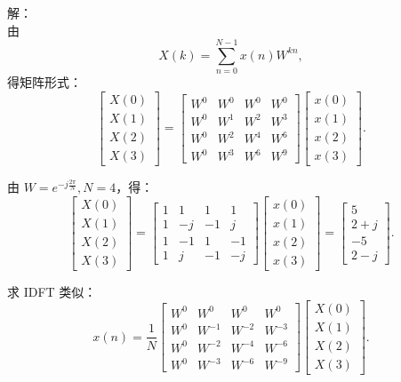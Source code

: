 \documentclass[a4paper,UTF8]{article}
\numberwithin{equation}{section}
\begin{document}
\begin{framed}
   	解：\\
   	由
   	\[
   	X(k) = \sum_{n=0}^{N-1} x(n)W^{kn},
   	\]
   	得矩阵形式：
   	\[
   	\begin{bmatrix}
   		X(0) \\ X(1) \\ X(2) \\ X(3)
   	\end{bmatrix}
   	=
   	\begin{bmatrix}
   		W^0 & W^0 & W^0 & W^0 \\
   		W^0 & W^1 & W^2 & W^3 \\
   		W^0 & W^2 & W^4 & W^6 \\
   		W^0 & W^3 & W^6 & W^9
   	\end{bmatrix}
   	\begin{bmatrix}
   		x(0) \\ x(1) \\ x(2) \\ x(3)
   	\end{bmatrix}.
   	\]
   	
   	由 $W = e^{-j\frac{2\pi}{N}}, N = 4$，得：
   	\[
   	\begin{bmatrix}
   		X(0) \\ X(1) \\ X(2) \\ X(3)
   	\end{bmatrix}
   	=
   	\begin{bmatrix}
   		1 & 1 & 1 & 1 \\
   		1 & -j & -1 & j \\
   		1 & -1 & 1 & -1 \\
   		1 & j & -1 & -j
   	\end{bmatrix}
   	\begin{bmatrix}
   		x(0) \\ x(1) \\ x(2) \\ x(3)
   	\end{bmatrix}
   	=
   	\begin{bmatrix}
   		5 \\ 2 + j \\ -5 \\ 2 - j
   	\end{bmatrix}.
   	\]
   	
   	求 IDFT 类似：
   	\[
   	x(n) =
   	\frac{1}{N}
   	\begin{bmatrix}
   		W^0 & W^0 & W^0 & W^0 \\
   		W^0 & W^{-1} & W^{-2} & W^{-3} \\
   		W^0 & W^{-2} & W^{-4} & W^{-6} \\
   		W^0 & W^{-3} & W^{-6} & W^{-9}
   	\end{bmatrix}
   	\begin{bmatrix}
   		X(0) \\ X(1) \\ X(2) \\ X(3)
   	\end{bmatrix}.
   	\]
   	

\end{framed}
\end{document}
